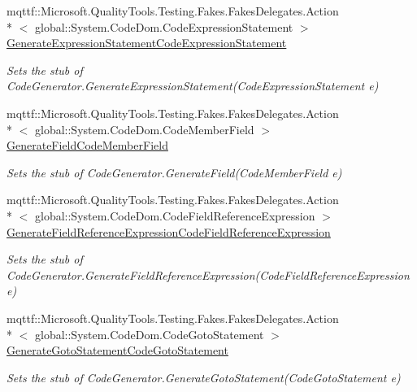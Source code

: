 \begin{DoxyCompactItemize}
mqttf\-::\-Microsoft.\-Quality\-Tools.\-Testing.\-Fakes.\-Fakes\-Delegates.\-Action\\*
$<$ global\-::\-System.\-Code\-Dom.\-Code\-Expression\-Statement $>$ \hyperlink{class_system_1_1_code_dom_1_1_compiler_1_1_fakes_1_1_stub_code_compiler_a96a9269984ca7b2610fb182781148b05}{Generate\-Expression\-Statement\-Code\-Expression\-Statement}
\begin{DoxyCompactList}\small\item\em Sets the stub of Code\-Generator.\-Generate\-Expression\-Statement(\-Code\-Expression\-Statement e)\end{DoxyCompactList}\item 
mqttf\-::\-Microsoft.\-Quality\-Tools.\-Testing.\-Fakes.\-Fakes\-Delegates.\-Action\\*
$<$ global\-::\-System.\-Code\-Dom.\-Code\-Member\-Field $>$ \hyperlink{class_system_1_1_code_dom_1_1_compiler_1_1_fakes_1_1_stub_code_compiler_a412c5fd5bcfff8fbdaca8c1e25b451cb}{Generate\-Field\-Code\-Member\-Field}
\begin{DoxyCompactList}\small\item\em Sets the stub of Code\-Generator.\-Generate\-Field(\-Code\-Member\-Field e)\end{DoxyCompactList}\item 
mqttf\-::\-Microsoft.\-Quality\-Tools.\-Testing.\-Fakes.\-Fakes\-Delegates.\-Action\\*
$<$ global\-::\-System.\-Code\-Dom.\-Code\-Field\-Reference\-Expression $>$ \hyperlink{class_system_1_1_code_dom_1_1_compiler_1_1_fakes_1_1_stub_code_compiler_a0d0291ea2c5c41eb5fa4366dcb0aac5e}{Generate\-Field\-Reference\-Expression\-Code\-Field\-Reference\-Expression}
\begin{DoxyCompactList}\small\item\em Sets the stub of Code\-Generator.\-Generate\-Field\-Reference\-Expression(\-Code\-Field\-Reference\-Expression e)\end{DoxyCompactList}\item 
mqttf\-::\-Microsoft.\-Quality\-Tools.\-Testing.\-Fakes.\-Fakes\-Delegates.\-Action\\*
$<$ global\-::\-System.\-Code\-Dom.\-Code\-Goto\-Statement $>$ \hyperlink{class_system_1_1_code_dom_1_1_compiler_1_1_fakes_1_1_stub_code_compiler_aa2cfaadeb51248b87045e78e83e4f959}{Generate\-Goto\-Statement\-Code\-Goto\-Statement}
\begin{DoxyCompactList}\small\item\em Sets the stub of Code\-Generator.\-Generate\-Goto\-Statement(\-Code\-Goto\-Statement e)\end{DoxyCompactList}\item 

\end{DoxyCompactItemize}
